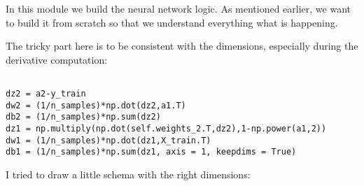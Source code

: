 In this module we build the neural network logic. As mentioned earlier, we want to build it from scratch so that we understand everything what is happening. 

The tricky part here is to be consistent with the dimensions, especially during the derivative computation:

\lstset{language=Python}
\lstset{frame=lines}
\lstset{basicstyle=\footnotesize}
\begin{lstlisting}

dz2 = a2-y_train
dw2 = (1/n_samples)*np.dot(dz2,a1.T)
db2 = (1/n_samples)*np.sum(dz2)
dz1 = np.multiply(np.dot(self.weights_2.T,dz2),1-np.power(a1,2))
dw1 = (1/n_samples)*np.dot(dz1,X_train.T)
db1 = (1/n_samples)*np.sum(dz1, axis = 1, keepdims = True)

\end{lstlisting}



 I tried to draw a little schema with the right dimensions: \\